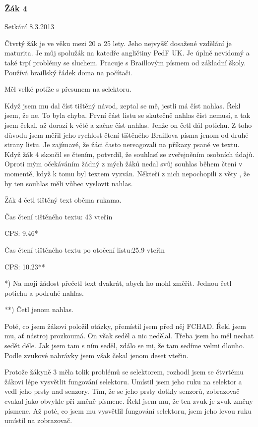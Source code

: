\subsubsection{Žák 4}

Setkání 8.3.2013

Čtvrtý žák je ve věku mezi 20 a 25 lety.  Jeho nejvyšší dosažené vzdělání je maturita.  Je můj spolužák na katedře angličtiny PedF UK. Je úplně nevidomý a také trpí problémy se sluchem.  Pracuje s Braillovým písmem od základní školy. Používá braillský řádek doma na počítači.

Měl velké potíže s přesunem na selektoru.

Když jsem mu dal číst tištěný návod, zeptal se mě, jestli má číst nahlas.  Řekl jsem, že ne. To byla chyba. První část listu se skutečně nahlas číst nemusí, a tak jsem čekal, až dorazí k větě  a začne číst nahlas. Jenže on četl dál potichu.  Z toho důvodu jsem měřil jeho rychlost čtení tištěného Braillova písma jenom od druhé strany listu. Je zajímavé, že žáci často nereagovali na příkazy psané ve textu. Když žák 4 skončil se čtením, potvrdil, že souhlasí se zveřejněním osobních údajů.  Oproti mým očekáváním žádný z mých žáků nedal svůj souhlas během čtení v momentě, když k tomu byl textem vyzván. Někteří z nich nepochopili z věty , že by ten souhlas měli vůbec vyslovit nahlas.

Žák 4 četl tištěný text oběma rukama.

Čas čtení tištěného textu: 43 vteřin %

CPS: 9.46*

Čas čtení tištěného textu po otočení listu:25.9 vteřin %

CPS: 10.23**

*) Na moji žádost přečetl text dvakrát, abych ho mohl změřit. Jednou četl potichu a podruhé nahlas.

**) Četl jenom nahlas.

Poté, co jsem žákovi položil otázky, přemístil jsem před něj FCHAD.  Řekl jsem mu, ať nástroj prozkoumá.  On však seděl a nic nedělal.  Třeba jsem ho měl nechat sedět déle. Jak jsem tam s ním seděl, zdálo se mi, že tam sedíme velmi dlouho. Podle zvukové nahrávky jsem však čekal jenom deset vteřin.

Protože žákyně 3 měla tolik problémů se selektorem, rozhodl jsem se čtvrtému žákovi lépe vysvětlit fungování selektoru.  Umístil jsem jeho ruku na selektor a vedl jeho prsty nad senzory. Tím, že se jeho prsty dotkly senzorů, zobrazovač cvakal jako obvykle při změně písmene.  Řekl jsem mu, že ten zvuk je zvuk změny písmene.  Až poté, co jsem mu vysvětlil fungování selektoru, jsem jeho levou ruku umístil na zobrazovač.


